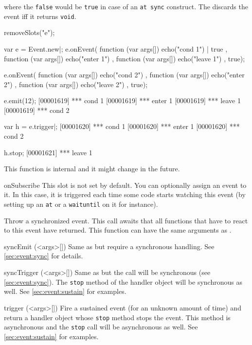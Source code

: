 \begin{urbiscriptapi}
\noindent
where the \lstinline|false| would be \lstinline|true| in case of an
\lstinline|at sync| construct.  The  discards the event iff it
returns \lstinline{void}.

\begin{urbicomment}
removeSlots("e");
\end{urbicomment}
\begin{urbiscript}
var e = Event.new|;
e.onEvent(
  function (var args[]) { echo("cond 1") | true },
  function (var args[]) { echo("enter 1") },
  function (var args[]) { echo("leave 1") },
  true);

e.onEvent(
  function (var args[]) { echo("cond 2") },
  function (var args[]) { echo("enter 2") },
  function (var args[]) { echo("leave 2") },
  true);

e.emit(12);
[00001619] *** cond 1
[00001619] *** enter 1
[00001619] *** leave 1
[00001619] *** cond 2

var h = e.trigger|;
[00001620] *** cond 1
[00001620] *** enter 1
[00001620] *** cond 2

h.stop;
[00001621] *** leave 1
\end{urbiscript}

This function is internal and it might change in the future.

\item[onSubscribe]%
  This slot is not set by default. You can optionally assign an event to
  it. In this case, it is triggered each time some code starts watching this
  event (by setting up an \lstinline|at| or a \lstinline|waituntil| on it
  for instance).

  Throw a synchronized event. This call awaits that all functions that have
  to react to this event have returned.  This function can have the same
  arguments as .

\item[syncEmit](<args>[])%
  Same as  but require a synchronous handling.  See
  \autoref{sec:event:sync} for details.

\item[syncTrigger](<args>[])%
  Same as  but the call will be synchronous (see
  \autoref{sec:event:sync}). The \lstinline|stop| method of the handler
  object will be synchronous as well.  See \autoref{sec:event:sustain} for
  examples.

\item[trigger](<args>[])%
  Fire a sustained event (for an unknown amount of time) and return a
  handler object whose \lstinline|stop| method stops the event. This method
  is asynchronous and the \lstinline|stop| call will be asynchronous as
  well.  See \autoref{sec:event:sustain} for examples.


\end{urbiscriptapi}
